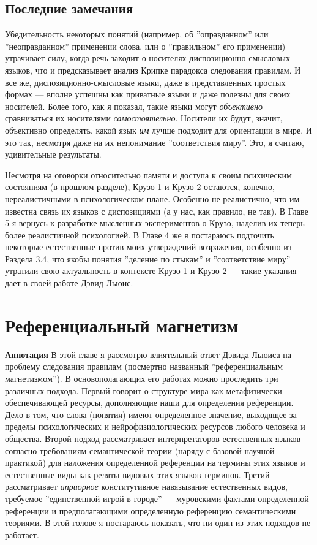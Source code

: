 \documentclass[11pt]{book}
\begin{document}
\section{Последние замечания}

Убедительность некоторых понятий (например, об ''оправданном'' или ''неоправданном'' применении слова, или о ''правильном'' его применении) утрачивает силу, когда речь заходит о носителях диспозиционно-смысловых языков, что и предсказывает анализ Крипке парадокса следования правилам. И все же, диспозиционно-смысловые языки, даже в представленных простых формах --- вполне успешны как приватные языки и даже полезны для своих носителей. Более того, как я показал, такие языки могут \textit{объективно} сравниваться их носителями \textit{самостоятельно}. Носители их будут, значит, объективно определять, какой язык \textit{им} лучше подходит для ориентации в мире. И это так, несмотря даже на их непонимание ''соответствия миру''. Это, я считаю, удивительные результаты.

Несмотря на оговорки относительно памяти и доступа к своим психическим состояниям (в прошлом разделе), Крузо-1 и Крузо-2 остаются, конечно, нереалистичными в психологическом плане. Особенно не реалистично, что им известна связь их языков с диспозициями (а у нас, как правило, не так). В Главе 5 я вернусь к разработке мысленных экспериментов о Крузо, наделив их теперь более реалистичной психологией. В Главе 4 же я постараюсь подточить некоторые естественные против моих утверждений возражения, особенно из Раздела 3.4, что якобы понятия ''деление по стыкам'' и ''соответствие миру'' утратили свою актуальность в контексте Крузо-1 и Крузо-2 --- такие указания дает в своей работе Дэвид Льюис.

\chapter{Референциальный магнетизм}

\qquad

\textbf{Аннотация} \quad В этой главе я рассмотрю влиятельный ответ Дэвида Льюиса на проблему следования правилам (посмертно названный ''референциальным магнетизмом''). В основополагающих его работах можно проследить три различных подхода. Первый говорит о структуре мира как метафизически обеспечивающей ресурсы, дополняющие наши для определения референции. Дело в том, что слова (понятия) имеют определенное значение, выходящее за пределы психологических и нейрофизиологических ресурсов любого человека и общества. Второй подход рассматривает интерпретаторов естественных языков согласно требованиям семантической теории (наряду с базовой научной практикой) для наложения определенной референции на термины этих языков и естественные виды как реляты видовых этих языков терминов. Третий рассматривает \textit{априорное} конститутивное навязывание естественных видов, требуемое ''единственной игрой в городе'' --- муровскими фактами определенной референции и предполагающими определенную референцию семантическими теориями. В этой голове я постараюсь показать, что ни один из этих подходов не работает.
\end{document}
